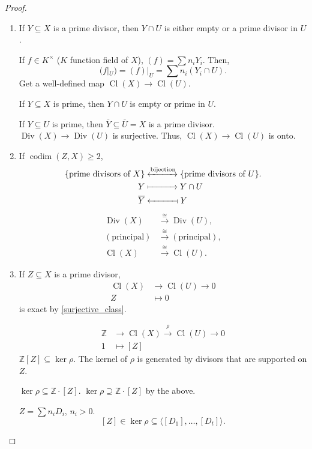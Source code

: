 \documentclass[12pt]{article}
\DeclareMathOperator{\codim}{codim}
\DeclareMathOperator{\Div}{Div}
\DeclareMathOperator{\Cl}{Cl}
\theoremstyle{definition}
\begin{document}
\begin{proof}
\begin{enumerate}[label=\arabic*)]
\item If $Y\subseteq X$ is a prime divisor, then $Y\cap U$ is either empty or a prime divisor in $U$.

If $f\in K^{\times}$ ($K$ function field of $X$), $(f)=\sum n_iY_i$. Then,
\[(f|_U)=(f)|_U=\sum n_i(Y_i\cap U).\]
Get a well-defined map $\Cl(X)\rightarrow\Cl(U)$.

If $Y\subseteq X$ is prime, then $Y\cap U$ is empty or prime in $U$.

If $Y\subseteq U$ is prime, then $\overline{Y}\subseteq\overline{U}=X$ is a prime divisor. $\Div(X)\rightarrow\Div(U)$ is surjective. Thus, $\Cl(X)\rightarrow\Cl(U)$ is onto.

\item If $\codim(Z,X)\geq2$,
\begin{align*}
\{\text{prime divisors of }X\}&\xleftrightarrow{\text{bijection}}\{\text{prime divisors of }U\}.\\
Y&\xmapsto{\hphantom{\text{bijection}}}Y\cap U\\
\overline{Y}&\xleftarrow{\hphantom{\text{bijection}}}\!\shortmid Y
\end{align*}
\begin{align*}
\Div(X)&\overset{\cong}{\longrightarrow}\Div(U),\\
(\text{principal})&\overset{\cong}{\longrightarrow}(\text{principal}),\\
\Cl(X)&\overset{\cong}{\longrightarrow}\Cl(U).
\end{align*}

\item If $Z\subseteq X$ is a prime divisor,
\begin{align*}
\Cl(X)&\longrightarrow\Cl(U)\longrightarrow0\\
Z&\longmapsto0
\end{align*}
is exact by \ref{surjective_class}.

\begin{align*}
\mathbb{Z}&\longrightarrow\Cl(X)\overset{\rho}{\longrightarrow}\Cl(U)\longrightarrow0\\
1&\longmapsto[Z]
\end{align*}
$\mathbb{Z}[Z]\subseteq\ker\rho$. The kernel of $\rho$ is generated by divisors that are supported on $Z$.

$\ker\rho\subseteq\mathbb{Z}\cdot[Z]$. $\ker\rho\supseteq\mathbb{Z}\cdot[Z]$ by the above.

$Z=\sum n_iD_i$, $n_i>0$.
\[[Z]\in\ker\rho\subseteq\langle[D_1],\ldots,[D_t]\rangle.\]
\end{enumerate}
\end{proof}
\end{document}
